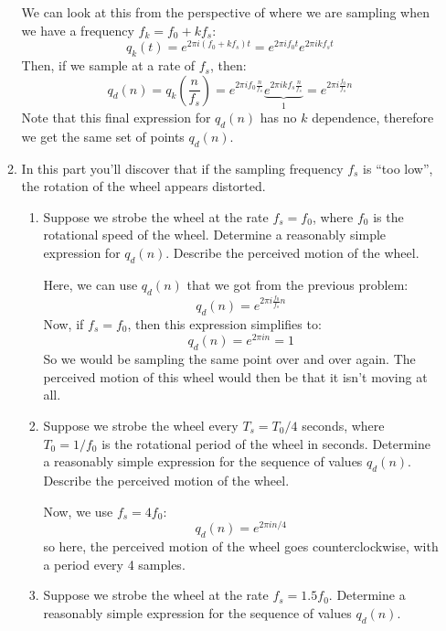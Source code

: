 \documentclass[10pt]{article}
\begin{document}
\begin{enumerate}[label=\alph*)]
\begin{enumerate}[label=\Roman*)]
					\begin{solution}
						We can look at this from the perspective of where we are sampling when we have 
						a frequency \( f_k = f_0 + kf_s \):
						\[
						q_k(t) = e^{2 \pi i (f_0 + kf_s) t} = e^{2 \pi i f_0 t} e^{2 \pi i kf_s t}
						\] 
						Then, if we sample at a rate of \( f_s \), then:
						\[
						q_d(n) = q_k\left( \frac{n}{f_s} \right) = e^{2 \pi i f_0 \frac{n}{f_s}} 
						\underbrace{e^{2 \pi i k f_s \frac{n}{f_s}}}_{1}
						= e^{2 \pi i \frac{f_0}{f_s} n}
						\] 
						Note that this final expression for \( q_d(n) \) has no \( k \) dependence, therefore 
						we get the same set of points \( q_d(n) \). 
					\end{solution}
				\item In this part you'll discover that if the sampling frequency \( f_s \) is ``too low'', the 
					rotation of the wheel appears distorted.
					\begin{enumerate}[label=\roman*)]
						\item Suppose we strobe the wheel at the rate \( f_s = f_0 \), where \( f_0 \) is the 
							rotational speed of the wheel. Determine a reasonably simple expression 
							for \( q_d(n) \). Describe the perceived motion of the wheel.

							\begin{solution}
								Here, we can use \( q_d(n) \) that we got from the previous problem:
								\[
								q_d(n) = e^{2 \pi i \frac{f_0}{f_s}n}
								\] 
								Now, if \( f_s = f_0 \), then this expression simplifies to:
								\[
								q_d(n) = e^{2 \pi i n} = 1
								\] 
								So we would be sampling the same point over and over again. The perceived motion 
								of this wheel would then be that it isn't moving at all. 
							\end{solution}
						\item Suppose we strobe the wheel every \( T_s = T_0/4\) seconds, where \( T_0 = 1 / f_0 \) 
							is the rotational period of the wheel in seconds. Determine a reasonably simple 
							expression for the sequence of values \( q_d(n) \). Describe the perceived motion 
							of the wheel. 

							\begin{solution}
								Now, we use \( f_s = 4f_0 \):
								\[
								q_d(n) = e^{2 \pi i n/4}
								\] 
								so here, the perceived motion of the wheel goes counterclockwise, with a period 
								every 4 samples. 
							\end{solution}
						\item Suppose we strobe the wheel at the rate \( f_s = 1.5f_0 \). Determine a reasonably 
							simple expression for the sequence of values \( q_d(n) \). 


\end{enumerate}
\end{enumerate}
\end{enumerate}
\end{document}
